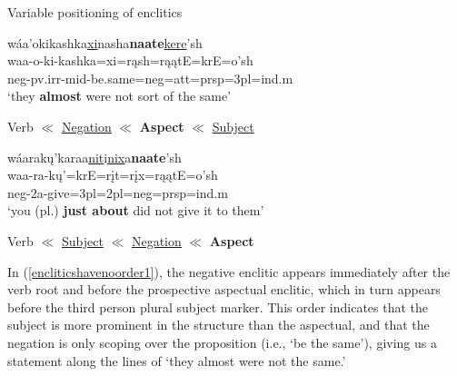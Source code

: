\begin{exe}

\item\label{encliticshavenoorder} Variable positioning of enclitics

	\begin{xlist}
	
	\item\label{encliticshavenoorder1}
	\glll wáa'okikashka\uline{\uline{xi}}nasha\textbf{naate}\uline{kere}'sh\\
	waa-o-ki-kashka=xi=rąsh=rąątE=krE=o'sh\\
	neg-pv.irr-mid-\textnormal{be.same}=neg=att=prsp=3pl=ind.m\\
	\glt `they \textbf{almost} were not sort of the same' \citep[30]{mixco1997a}
	
	Verb $\ll$ \uline{\uline{Negation}} $\ll$ \textbf{Aspect} $\ll$ \uline{Subject}

	
	\item\label{encliticshavenoorder2}
	\glll wáarakų'karaa\uline{nit}i\uline{\uline{nix}}a\textbf{naate}'sh\\
	waa-ra-kų'=krE=rįt=rįx=rąątE=o'sh\\
	neg-2a-\textnormal{give}=3pl=2pl=neg=prsp=ind.m\\
	\glt `you (pl.) \textbf{just about} did not give it to them' \citep[468]{hollow1970}

	Verb $\ll$ \uline{Subject} $\ll$ \uline{\uline{Negation}} $\ll$ \textbf{Aspect}
	
	\end{xlist}

\end{exe}

In (\ref{encliticshavenoorder1}), the negative enclitic appears immediately after the verb root and before the prospective aspectual enclitic, which in turn appears before the third person plural subject marker. This order indicates that the subject is more prominent in the structure than the aspectual, and that the negation is only scoping over the proposition (i.e., `be the same'), giving us a statement along the lines of `they almost were not the same.'

